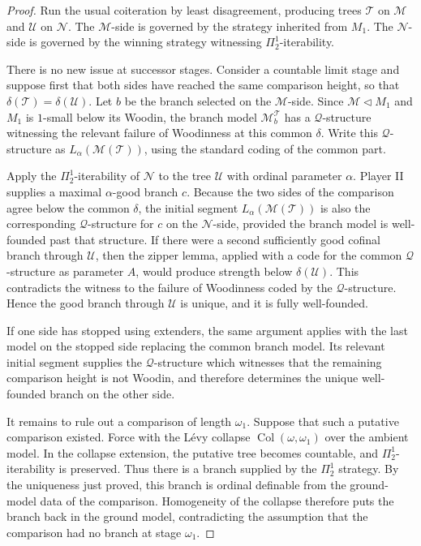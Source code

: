\documentclass[a4paper,11pt]{article}
\begin{document}
\begin{proof}
Run the usual coiteration by least disagreement, producing trees $\mathcal T$ on $\mathcal M$ and $\mathcal U$ on $\mathcal N$.  The $\mathcal M$-side is governed by the strategy inherited from $M_1$.  The $\mathcal N$-side is governed by the winning strategy witnessing $\Pi^1_2$-iterability.

There is no new issue at successor stages.  Consider a countable limit stage and suppose first that both sides have reached the same comparison height, so that $\delta(\mathcal T)=\delta(\mathcal U)$.  Let $b$ be the branch selected on the $\mathcal M$-side.  Since $\mathcal M\triangleleft M_1$ and $M_1$ is $1$-small below its Woodin, the branch model $\mathcal M_b^{\mathcal T}$ has a $\mathcal Q$-structure witnessing the relevant failure of Woodinness at this common $\delta$.  Write this $\mathcal Q$-structure as $L_\alpha(\mathcal M(\mathcal T))$, using the standard coding of the common part.

Apply the $\Pi^1_2$-iterability of $\mathcal N$ to the tree $\mathcal U$ with ordinal parameter $\alpha$.  Player II supplies a maximal $\alpha$-good branch $c$.  Because the two sides of the comparison agree below the common $\delta$, the initial segment $L_\alpha(\mathcal M(\mathcal T))$ is also the corresponding $\mathcal Q$-structure for $c$ on the $\mathcal N$-side, provided the branch model is well-founded past that structure.  If there were a second sufficiently good cofinal branch through $\mathcal U$, then the zipper lemma, applied with a code for the common $\mathcal Q$-structure as parameter $A$, would produce strength below $\delta(\mathcal U)$.  This contradicts the witness to the failure of Woodinness coded by the $\mathcal Q$-structure.  Hence the good branch through $\mathcal U$ is unique, and it is fully well-founded.

If one side has stopped using extenders, the same argument applies with the last model on the stopped side replacing the common branch model.  Its relevant initial segment supplies the $\mathcal Q$-structure which witnesses that the remaining comparison height is not Woodin, and therefore determines the unique well-founded branch on the other side.

It remains to rule out a comparison of length $\omega_1$.  Suppose that such a putative comparison existed.  Force with the L\'evy collapse $\operatorname{Col}(\omega,\omega_1)$ over the ambient model.  In the collapse extension, the putative tree becomes countable, and $\Pi^1_2$-iterability is preserved.  Thus there is a branch supplied by the $\Pi^1_2$ strategy.  By the uniqueness just proved, this branch is ordinal definable from the ground-model data of the comparison.  Homogeneity of the collapse therefore puts the branch back in the ground model, contradicting the assumption that the comparison had no branch at stage $\omega_1$.


\end{proof}
\end{document}
